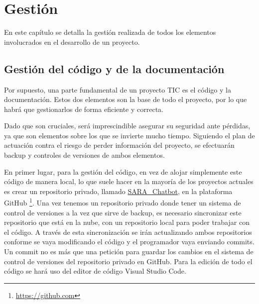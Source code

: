 \chapter{Gestión}

En este capítulo se detalla la gestión realizada de todos los elementos involucrados en el desarrollo de un proyecto.

\section{Gestión del código y de la documentación}

Por supuesto, una parte fundamental de un proyecto \gls{TIC} es el código y la documentación. Estos dos elementos son la base de todo el proyecto, por lo que habrá que gestionarlos de forma eficiente y correcta.

Dado que son cruciales, será imprescindible asegurar su seguridad ante pérdidas, ya que son elementos sobre los que se invierte mucho tiempo. Siguiendo el plan de actuación contra el riesgo de perder información del proyecto, se efectuarán \gls{backup} y controles de versiones de ambos elementos.

En primer lugar, para la gestión del código, en vez de alojar simplemente este código de manera local, lo que suele hacer en la mayoría de los proyectos actuales es crear un repositorio privado, llamado \href{https://github.com/Mario-Carmona/SARA_Chatbot}{SARA\_Chatbot}, en la plataforma GitHub \footnote{\url{https://github.com}}. Una vez tenemos un repositorio privado donde tener un sistema de control de versiones a la vez que sirve de \gls{backup}, es necesario sincronizar este repositorio que está en la nube, con un repositorio local para poder trabajar con el código. A través de esta sincronización se irán actualizando ambos repositorios conforme se vaya modificando el código y el programador vaya enviando commits. Un commit no es más que una petición para guardar los cambios en el sistema de control de versiones del repositorio privado en GitHub. Para la edición de todo el código se hará uso del editor de código Visual Studio Code.


